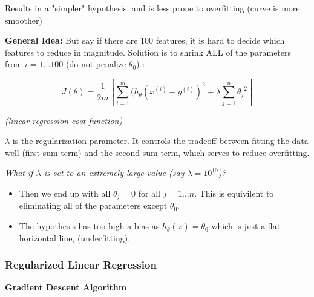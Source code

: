 \documentclass{article}
\begin{document}
Results in a "simpler" hypothesis, and is less prone to overfitting (curve is more smoother)



\begin{mybox}

\textbf{General Idea: } But say if there are 100 features, it is hard to decide which features to reduce in magnitude. Solution is to shrink ALL of the parameters from $i = 1...100$ (do not penalize $\theta_0$) :


\begin{equation}
    J(\theta) = \frac{1}{2m} \left[ \sum_{i=1}^m ( h_{\theta} (x^{(i)} - y^{(i)})^2 + \lambda \sum_{j=1}^n {\theta_j}^2 \right]
\end{equation}

\begin{center}
\textit{(linear regression cost function)}
\end{center}

$\lambda$ is the regularization parameter. It controls the tradeoff between fitting the data well (first sum term) and the second sum term, which serves to reduce overfitting.


\end{mybox}



\begin{myboxr}

\textit{What if $\lambda$ is set to an extremely large value (say $\lambda = 10^{10}$)?}

\begin{itemize}

    \item Then we end up with all $\theta_j = 0$ for all $j = 1 ... n$. This is equivilent to eliminating all of the parameters except $\theta_0$. 
    
    \item The hypothesis has too high a bias as $h_{\theta} (x) = \theta_0$ which is just a flat horizontal line, (underfitting).
\end{itemize}

\end{myboxr}


\subsubsection{Regularized Linear Regression}



\textbf{Gradient Descent Algorithm}
\end{document}
